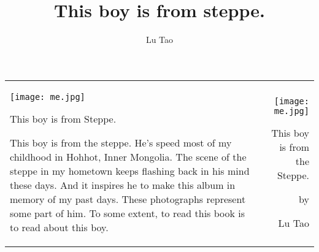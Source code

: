 \documentclass[12pt]{article}
\title{This boy is from steppe.}
\author{Lu Tao}
\begin{document}
\pagestyle{empty}
\begin{tabular*}{\textwidth}[t]{l@{\extracolsep{\fill}}r}
\begin{minipage}[t]{8in}
\centering
\texttt{[image: me.jpg]}

\begin{center}
{\LARGE This boy is from Steppe.}
\end{center}

\large{This boy is from the steppe.
He's speed most of my childhood in Hohhot, Inner Mongolia. 
The scene of the steppe in my hometown keeps flashing back in his mind these days.  
And it inspires he to make this album in memory of my past days.
These photographs represent some part of him.
To some extent, to read this book is to read about this boy.}

\end{minipage}
&

\begin{minipage}[t]{8in}
\centering

\texttt{[image: me.jpg]}

\vspace*{0.1in}
{\huge This boy is from the Steppe.}

\vspace*{0.1in}
by

\vspace*{0.1in}
{\LARGE Lu Tao}
\end{minipage}

\\
\end{tabular*}
\end{document}
